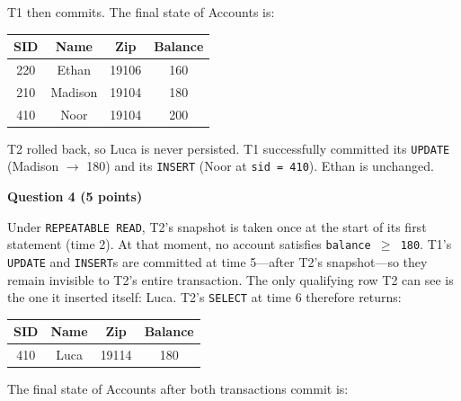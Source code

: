 \documentclass[12pt,letterpaper, onecolumn]{exam}
\begin{document}
\begin{questions}
\begin{solution}
\begin{parts}
      T1 then commits. The final state of Accounts is:

      \begin{center}
      \begin{tabular}{|c|c|c|c|}
      \hline
      \textbf{SID} & \textbf{Name} & \textbf{Zip} & \textbf{Balance} \\
      \hline
      220 & Ethan   & 19106 & 160 \\
      210 & Madison & 19104 & 180 \\
      410 & Noor    & 19104 & 200 \\
      \hline
      \end{tabular}
      \end{center}

      T2 rolled back, so Luca is never persisted. T1 successfully committed its \texttt{UPDATE} (Madison $\to$ 180) and its \texttt{INSERT} (Noor at \texttt{sid = 410}). Ethan is unchanged.
    \end{parts}
  \end{solution}
  \question \textbf{Question 4 (5 points)}
  \begin{solution}
    Under \texttt{REPEATABLE READ}, T2's snapshot is taken once at the start of its first statement (time 2). At that moment, no account satisfies \texttt{balance $\geq$ 180}. T1's \texttt{UPDATE} and \texttt{INSERT}s are committed at time 5---after T2's snapshot---so they remain invisible to T2's entire transaction. The only qualifying row T2 can see is the one it inserted itself: Luca. T2's \texttt{SELECT} at time 6 therefore returns:

    \begin{center}
    \begin{tabular}{|c|c|c|c|}
    \hline
    \textbf{SID} & \textbf{Name} & \textbf{Zip} & \textbf{Balance} \\
    \hline
    410 & Luca & 19114 & 180 \\
    \hline
    \end{tabular}
    \end{center}

    The final state of Accounts after both transactions commit is:


\end{solution}
\end{questions}
\end{document}
